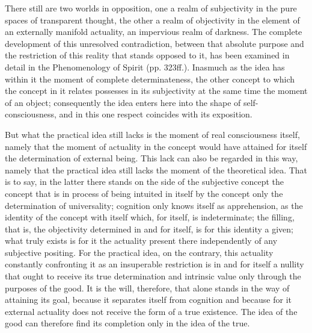 There still are two worlds in opposition,
one a realm of subjectivity in
the pure spaces of transparent thought,
the other a realm of objectivity in
the element of an externally manifold actuality,
an impervious realm of darkness.
The complete development of this unresolved contradiction,
between that absolute purpose
and the restriction of this reality
that stands opposed to it,
has been examined in detail in
the Phenomenology of Spirit (pp. 323ff.).
Inasmuch as the idea has within it
the moment of complete determinateness,
the other concept to which the concept in
it relates possesses in its subjectivity
at the same time the moment of an object;
consequently the idea enters here into
the shape of self-consciousness,
and in this one respect
coincides with its exposition.

But what the practical idea still lacks is
the moment of real consciousness itself,
namely that the moment of actuality in the concept
would have attained for itself
the determination of external being.
This lack can also be regarded in this way,
namely that the practical idea still lacks the moment
of the theoretical idea.
That is to say, in the latter there stands
on the side of the subjective concept
the concept that is in process of being intuited
in itself by the concept
only the determination of universality;
cognition only knows itself as apprehension,
as the identity of the concept with itself
which, for itself, is indeterminate;
the filling, that is, the objectivity
determined in and for itself,
is for this identity a given;
what truly exists is for it
the actuality present there independently
of any subjective positing.
For the practical idea, on the contrary,
this actuality constantly confronting it as
an insuperable restriction is in and for itself a nullity
that ought to receive its true determination and intrinsic value
only through the purposes of the good.
It is the will, therefore, that alone stands
in the way of attaining its goal,
because it separates itself from cognition
and because for it external actuality does not
receive the form of a true existence.
The idea of the good can therefore find its completion
only in the idea of the true.


